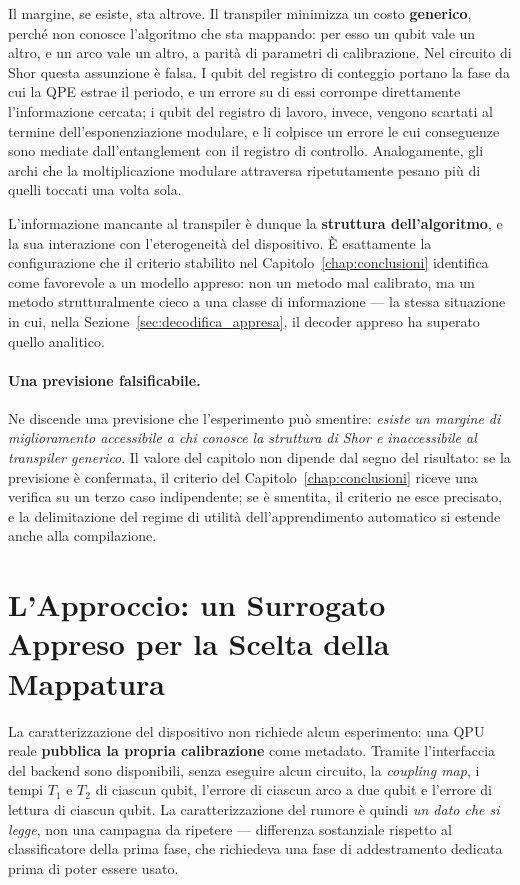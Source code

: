 \begin{onehalfspace}
Il margine, se esiste, sta altrove. Il transpiler minimizza un costo \textbf{generico}, perché non conosce l'algoritmo che sta mappando: per esso un qubit vale un altro, e un arco vale un altro, a parità di parametri di calibrazione. Nel circuito di Shor questa assunzione è falsa. I qubit del registro di conteggio portano la fase da cui la \ac{QPE} estrae il periodo, e un errore su di essi corrompe direttamente l'informazione cercata; i qubit del registro di lavoro, invece, vengono scartati al termine dell'esponenziazione modulare, e li colpisce un errore le cui conseguenze sono mediate dall'entanglement con il registro di controllo. Analogamente, gli archi che la moltiplicazione modulare attraversa ripetutamente pesano più di quelli toccati una volta sola.

L'informazione mancante al transpiler è dunque la \textbf{struttura dell'algoritmo}, e la sua interazione con l'eterogeneità del dispositivo. È esattamente la configurazione che il criterio stabilito nel Capitolo~\ref{chap:conclusioni} identifica come favorevole a un modello appreso: non un metodo mal calibrato, ma un metodo strutturalmente cieco a una classe di informazione --- la stessa situazione in cui, nella Sezione~\ref{sec:decodifica_appresa}, il decoder appreso ha superato quello analitico.

\paragraph{Una previsione falsificabile.}
Ne discende una previsione che l'esperimento può smentire: \emph{esiste un margine di miglioramento accessibile a chi conosce la struttura di Shor e inaccessibile al transpiler generico}. Il valore del capitolo non dipende dal segno del risultato: se la previsione è confermata, il criterio del Capitolo~\ref{chap:conclusioni} riceve una verifica su un terzo caso indipendente; se è smentita, il criterio ne esce precisato, e la delimitazione del regime di utilità dell'apprendimento automatico si estende anche alla compilazione.

\section{L'Approccio: un Surrogato Appreso per la Scelta della Mappatura}
\label{sec:surrogato_layout}

La caratterizzazione del dispositivo non richiede alcun esperimento: una \ac{QPU} reale \textbf{pubblica la propria calibrazione} come metadato. Tramite l'interfaccia del backend sono disponibili, senza eseguire alcun circuito, la \textit{coupling map}, i tempi $T_1$ e $T_2$ di ciascun qubit, l'errore di ciascun arco a due qubit e l'errore di lettura di ciascun qubit. La caratterizzazione del rumore è quindi \emph{un dato che si legge}, non una campagna da ripetere --- differenza sostanziale rispetto al classificatore della prima fase, che richiedeva una fase di addestramento dedicata prima di poter essere usato.


\end{onehalfspace}

